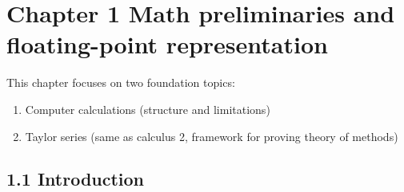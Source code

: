\documentclass{article}
\theoremstyle{remark}
\begin{document}
\section{Chapter 1 Math preliminaries and floating-point representation} 

This chapter focuses on two foundation topics:
\begin{enumerate}
\item Computer calculations (structure and limitations)
\item Taylor series (same as calculus 2, framework for proving theory of methods)
\end{enumerate}

\subsection{1.1 Introduction}
\end{document}
